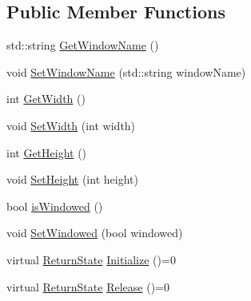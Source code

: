 \subsection*{Public Member Functions}
\begin{DoxyCompactItemize}
\item 
std\-::string \hyperlink{class_osiris_i_1_1_graphics_1_1_devices_1_1_i_window_a6c91cb2d84a519bc131d044684a76c0a}{Get\-Window\-Name} ()
\item 
void \hyperlink{class_osiris_i_1_1_graphics_1_1_devices_1_1_i_window_a7978d7726fdb500455026847d45df129}{Set\-Window\-Name} (std\-::string window\-Name)
\item 
int \hyperlink{class_osiris_i_1_1_graphics_1_1_devices_1_1_i_window_a021b4f293d6ec5de956c3513e3269bab}{Get\-Width} ()
\item 
void \hyperlink{class_osiris_i_1_1_graphics_1_1_devices_1_1_i_window_a1417ecc08f0fc2895d4219cce566b1a5}{Set\-Width} (int width)
\item 
int \hyperlink{class_osiris_i_1_1_graphics_1_1_devices_1_1_i_window_a6b911910fc7b90ceb3b7fbea504e3d44}{Get\-Height} ()
\item 
void \hyperlink{class_osiris_i_1_1_graphics_1_1_devices_1_1_i_window_a2d2e83511491f8f09adde2a872a9850b}{Set\-Height} (int height)
\item 
bool \hyperlink{class_osiris_i_1_1_graphics_1_1_devices_1_1_i_window_ab83c78cf6d1009f5a36857ea08dfa70a}{is\-Windowed} ()
\item 
void \hyperlink{class_osiris_i_1_1_graphics_1_1_devices_1_1_i_window_a8bb2fc3163d098ae5b151ac2abbfa3ba}{Set\-Windowed} (bool windowed)
\item 
virtual \hyperlink{namespace_osiris_i_a8f53bf938dc75c65c6a529694514013e}{Return\-State} \hyperlink{class_osiris_i_1_1_graphics_1_1_devices_1_1_i_window_a0d2a04e93bf62ce8b6100e348753c5fc}{Initialize} ()=0
\item 
virtual \hyperlink{namespace_osiris_i_a8f53bf938dc75c65c6a529694514013e}{Return\-State} \hyperlink{class_osiris_i_1_1_graphics_1_1_devices_1_1_i_window_a13db31d454be5a9d5f18e5938477f964}{Release} ()=0
\end{DoxyCompactItemize}


